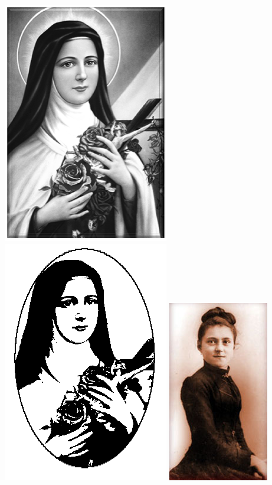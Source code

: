 \documentclass[a5paper,headsepline,titlepage,11pt,nnormalheadings,DIVcalc,openany]{scrbook}
\begin{document}
\includegraphics[scale=5]{./theresia-bw.png}
\clearpage%
\includegraphics[scale=1]{./theresia-logo.png}
\clearpage%
\includegraphics[scale=0.5]{./theresia-1.jpg}
\end{document}
